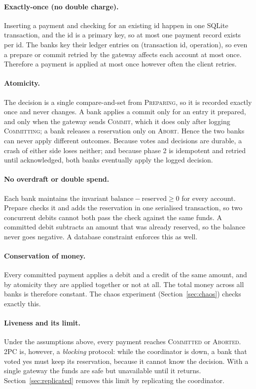 \documentclass[11pt]{article}
\newcommand{\code}[1]{\texttt{\detokenize{#1}}}
\newcommand{\st}[1]{\textsc{#1}}
\begin{document}
\paragraph{Exactly-once (no double charge).}
Inserting a payment and checking for an existing id happen in one SQLite
transaction, and the id is a primary key, so at most one payment record exists
per id. The banks key their ledger entries on (transaction id, operation), so
even a prepare or commit retried by the gateway affects each account at most
once. Therefore a payment is applied at most once however often the client
retries.

\paragraph{Atomicity.}
The decision is a single compare-and-set from \st{Preparing}, so it is
recorded exactly once and never changes. A bank applies a commit only for an
entry it prepared, and only when the gateway sends \st{Commit}, which it does
only after logging \st{Committing}; a bank releases a reservation only on
\st{Abort}. Hence the two banks can never apply different outcomes. Because
votes and decisions are durable, a crash of either side loses neither; and
because phase 2 is idempotent and retried until acknowledged, both banks
eventually apply the logged decision.

\paragraph{No overdraft or double spend.}
Each bank maintains the invariant
$\text{balance} - \text{reserved} \ge 0$ for every account. Prepare checks it
and adds the reservation in one serialised transaction, so two concurrent debits
cannot both pass the check against the same funds. A committed debit subtracts
an amount that was already reserved, so the balance never goes negative. A
database \code{CHECK} constraint enforces this as well.

\paragraph{Conservation of money.}
Every committed payment applies a debit and a credit of the same amount, and by
atomicity they are applied together or not at all. The total money across all
banks is therefore constant. The chaos experiment
(Section~\ref{sec:chaos}) checks exactly this.

\paragraph{Liveness and its limit.}
Under the assumptions above, every payment reaches \st{Committed} or
\st{Aborted}. 2PC is, however, a \emph{blocking} protocol: while the
coordinator is down, a bank that voted yes must keep its reservation, because
it cannot know the decision. With a single gateway the funds are safe but
unavailable until it returns. Section~\ref{sec:replicated} removes this limit
by replicating the coordinator.
\end{document}
